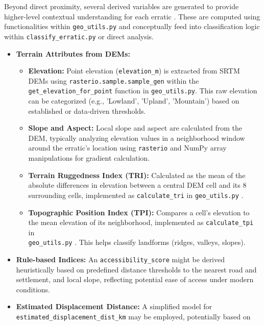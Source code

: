 \documentclass[
11pt, %
english, %
singlespacing, %
headsepline, %
]{MastersDoctoralThesis} %
\begin{document}
Beyond direct proximity, several derived variables are generated to provide higher-level contextual understanding for each erratic \cite{Burrough2015}. These are computed using functionalities within \texttt{geo\_utils.py} and conceptually feed into classification logic within \texttt{classify\_erratic.py} or direct analysis.
\begin{itemize}
    \item \textbf{Terrain Attributes from DEMs:}
        \begin{itemize}
            \item \textbf{Elevation:} Point elevation (\texttt{elevation\_m}) is extracted
            from SRTM DEMs using \texttt{rasterio.sample.sample\_gen} within the 
            \texttt{get\_elevation\_for\_point} function in \texttt{geo\_utils.py}. 
            This raw elevation can be categorized (e.g., 'Lowland', 'Upland', 'Mountain') 
            based on established or data-driven thresholds.
            \item \textbf{Slope and Aspect:} Local slope and aspect are calculated from
            the DEM, typically analyzing elevation values in a neighborhood window around 
            the erratic's location using \texttt{rasterio} and NumPy array manipulations for gradient calculation.
            \item \textbf{Terrain Ruggedness Index (TRI):} Calculated as the mean of the absolute differences in elevation between a central DEM cell and its 8 surrounding cells, implemented as \texttt{calculate\_tri} in 
            \texttt{geo\_utils.py} \cite{Riley1999}.
            \item \textbf{Topographic Position Index (TPI):} Compares a cell's elevation 
            to the mean elevation of its neighborhood, implemented as 
            \texttt{calculate\_tpi} in \\\texttt{geo\_utils.py} \cite{Weiss2001}. This helps
            classify landforms (ridges, valleys, slopes).
        \end{itemize}
    \item \textbf{Rule-based Indices:} An \texttt{accessibility\_score} might be derived 
    heuristically based on predefined distance thresholds to the nearest road and 
    settlement, and local slope, reflecting potential ease of access under modern 
    conditions.
    \item \textbf{Estimated Displacement Distance:} A simplified model for \\
    \texttt{estimated\_displacement\_dist\_km} may be employed, potentially based on 

\end{itemize}
\end{document}
